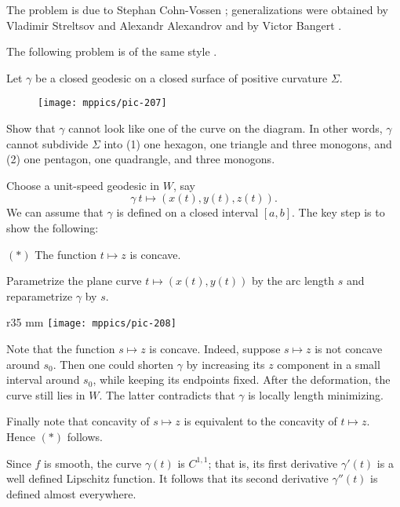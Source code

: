 The problem is due to Stephan Cohn-Vossen \cite[Satz 9 in][]{convossen};
generalizations were obtained  by 
Vladimir Streltsov and Alexandr Alexandrov 
\cite{streltsov-alexandrov} 
and 
by Victor Bangert \cite{bangert}.

The following problem is of the same style \cite{petrunin-self-crossing-geodesics}.

\begin{pr}
Let $\gamma$ be a closed geodesic on a closed surface of positive curvature $\Sigma$.
\begin{figure}[ht!]
\vskip-0mm
\centering
\texttt{[image: mppics/pic-207]}
\end{figure}
Show that $\gamma$ cannot look like one of the curve on the diagram.
In other words, $\gamma$ cannot subdivide $\Sigma$ into (1) one hexagon, one triangle and three monogons, and (2) one pentagon, one quadrangle, and three monogons.
\end{pr}



Choose a unit-speed geodesic in $W$, say
\[\gamma\:t\mapsto(x(t),y(t),z(t)).\]
We can assume that $\gamma$ is defined on a closed interval $[a,b]$.
The key step is to show the following:

\begin{cl}{$({*})$} 
The function $t\mapsto z$ is concave.
\end{cl}


Parametrize the plane curve $t\mapsto (x(t),y(t))$ by the arc length $s$
and reparametrize $\gamma$ by $s$.

\begin{wrapfigure}{r}{35 mm}
\vskip-4mm
\centering
\texttt{[image: mppics/pic-208]}
\end{wrapfigure}

Note that the function $s\mapsto z$ is concave.
Indeed, suppose $s\mapsto z$ is not concave around $s_0$.
Then one could shorten $\gamma$ by increasing its $z$ component in a small interval around $s_0$, while keeping its endpoints fixed.
After the deformation, the curve still lies in $W$.
The latter contradicts that $\gamma$ is locally length minimizing.

Finally note that concavity of $s\mapsto z$ is equivalent to the concavity of $t\mapsto z$.
Hence $({*})$ follows.



Since $f$ is smooth, 
the curve $\gamma(t)$ is $C^{1,1}$; 
that is, its first derivative $\gamma'(t)$ is a well defined Lipschitz function.
It follows that its second derivative $\gamma''(t)$ is defined almost everywhere.

